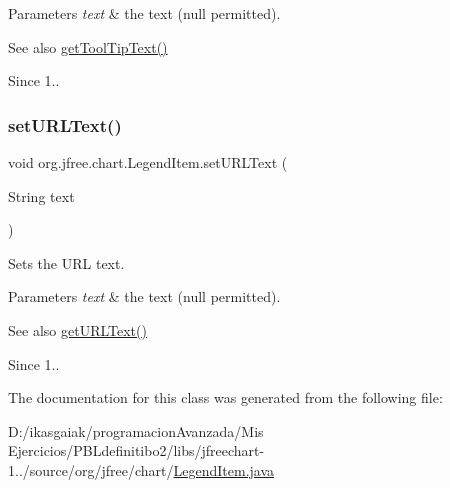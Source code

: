 \begin{DoxyParams}{Parameters}
{\em text} & the text ({\ttfamily null} permitted).\\
\hline
\end{DoxyParams}
\begin{DoxySeeAlso}{See also}
\mbox{\hyperlink{classorg_1_1jfree_1_1chart_1_1_legend_item_ab6b24eec75be7370f4fc8fe241932ff3}{get\+Tool\+Tip\+Text()}} 
\end{DoxySeeAlso}
\begin{DoxySince}{Since}
1.. 
\end{DoxySince}
\mbox{\label{classorg_1_1jfree_1_1chart_1_1_legend_item_a63d5f8c94b5296c1ccfb8adf20f79def}} 
\subsubsection{\texorpdfstring{set\+U\+R\+L\+Text()}{setURLText()}}
{\footnotesize\ttfamily void org.\+jfree.\+chart.\+Legend\+Item.\+set\+U\+R\+L\+Text (\begin{DoxyParamCaption}\item[{String}]{text }\end{DoxyParamCaption})}

Sets the U\+RL text.


\begin{DoxyParams}{Parameters}
{\em text} & the text ({\ttfamily null} permitted).\\
\hline
\end{DoxyParams}
\begin{DoxySeeAlso}{See also}
\mbox{\hyperlink{classorg_1_1jfree_1_1chart_1_1_legend_item_ae50e62bf0aebde30e8e8e1c5fac9952f}{get\+U\+R\+L\+Text()}}
\end{DoxySeeAlso}
\begin{DoxySince}{Since}
1.. 
\end{DoxySince}


The documentation for this class was generated from the following file\+:\begin{DoxyCompactItemize}
\item 
D\+:/ikasgaiak/programacion\+Avanzada/\+Mis Ejercicios/\+P\+B\+Ldefinitibo2/libs/jfreechart-\/1../source/org/jfree/chart/\mbox{\hyperlink{_legend_item_8java}{Legend\+Item.\+java}}\end{DoxyCompactItemize}
